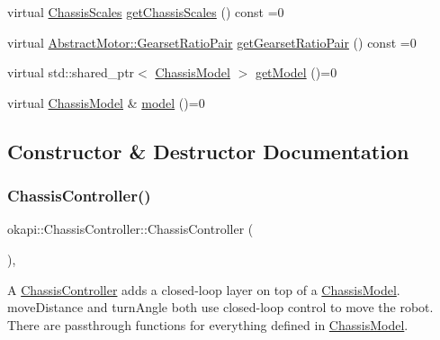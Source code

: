 \begin{DoxyCompactItemize}
\item 
virtual \mbox{\hyperlink{classokapi_1_1ChassisScales}{Chassis\+Scales}} \mbox{\hyperlink{classokapi_1_1ChassisController_a0a8e32fc7adad8567f550954505aaa06}{get\+Chassis\+Scales}} () const =0
\item 
virtual \mbox{\hyperlink{structokapi_1_1AbstractMotor_1_1GearsetRatioPair}{Abstract\+Motor\+::\+Gearset\+Ratio\+Pair}} \mbox{\hyperlink{classokapi_1_1ChassisController_aa19351888b997d4a6596dac24520ebff}{get\+Gearset\+Ratio\+Pair}} () const =0
\item 
virtual std\+::shared\+\_\+ptr$<$ \mbox{\hyperlink{classokapi_1_1ChassisModel}{Chassis\+Model}} $>$ \mbox{\hyperlink{classokapi_1_1ChassisController_a1971d4b54b61718437824c026aca53c9}{get\+Model}} ()=0
\item 
virtual \mbox{\hyperlink{classokapi_1_1ChassisModel}{Chassis\+Model}} \& \mbox{\hyperlink{classokapi_1_1ChassisController_a239802eda7e4317a65d1a04994f7b97e}{model}} ()=0
\end{DoxyCompactItemize}


\subsection{Constructor \& Destructor Documentation}
\mbox{\label{classokapi_1_1ChassisController_a8a4a431cb9da03a1c84e600dc0e31333}} 
\subsubsection{\texorpdfstring{ChassisController()}{ChassisController()}}
{\footnotesize\ttfamily okapi\+::\+Chassis\+Controller\+::\+Chassis\+Controller (\begin{DoxyParamCaption}{ }\end{DoxyParamCaption})\hspace{0.3cm}{\ttfamily [explicit]}, {\ttfamily [default]}}

A \mbox{\hyperlink{classokapi_1_1ChassisController}{Chassis\+Controller}} adds a closed-\/loop layer on top of a \mbox{\hyperlink{classokapi_1_1ChassisModel}{Chassis\+Model}}. move\+Distance and turn\+Angle both use closed-\/loop control to move the robot. There are passthrough functions for everything defined in \mbox{\hyperlink{classokapi_1_1ChassisModel}{Chassis\+Model}}.


